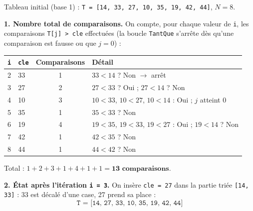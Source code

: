 \documentclass[11pt]{article}
\begin{document}
\begin{corrige}
Tableau initial (base 1) : \texttt{T = [14, 33, 27, 10, 35, 19, 42, 44]}, $N = 8$.

\textbf{1. Nombre total de comparaisons.} On compte, pour chaque valeur de \texttt{i}, les comparaisons \texttt{T[j] > cle} effectuées (la boucle \texttt{TantQue} s'arrête dès qu'une comparaison est fausse ou que $j = 0$) :

\begin{center}
\begin{tabularx}{\linewidth}{|c|l|c|X|}
\hline
\rowcolor{popblueL}
\texttt{i} & \texttt{cle} & Comparaisons & Détail \\
\hline
2 & 33 & 1 & $33 < 14$ ? Non $\rightarrow$ arrêt \\
\hline
3 & 27 & 2 & $27 < 33$ ? Oui ; $27 < 14$ ? Non \\
\hline
4 & 10 & 3 & $10 < 33$, $10 < 27$, $10 < 14$ : Oui ; $j$ atteint 0 \\
\hline
5 & 35 & 1 & $35 < 33$ ? Non \\
\hline
6 & 19 & 4 & $19 < 35$, $19 < 33$, $19 < 27$ : Oui ; $19 < 14$ ? Non \\
\hline
7 & 42 & 1 & $42 < 35$ ? Non \\
\hline
8 & 44 & 1 & $44 < 42$ ? Non \\
\hline
\end{tabularx}
\end{center}

Total : $1 + 2 + 3 + 1 + 4 + 1 + 1 = \textbf{13 comparaisons}$.

\textbf{2. État après l'itération \texttt{i = 3}.} On insère \texttt{cle = 27} dans la partie triée \texttt{[14, 33]} : 33 est décalé d'une case, 27 prend sa place :
\[ \texttt{T = [14, 27, 33, 10, 35, 19, 42, 44]} \]
\end{corrige}
\end{document}

